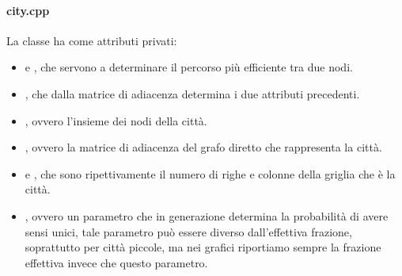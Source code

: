 \documentclass[main.tex]{subfiles}
\begin{document}
        \paragraph{city.cpp}
            La classe  ha come attributi privati:
            \begin{itemize}
                \item {} e , che servono a determinare il percorso più efficiente tra due nodi.
                \item {}, che dalla matrice di adiacenza determina i due attributi precedenti.
                \item {}, ovvero l'insieme dei nodi della città.
                \item {}, ovvero la matrice di adiacenza del grafo diretto che rappresenta la città.
                \item {} e , che sono ripettivamente il numero di righe e colonne della griglia che è la città.
                \item {}, ovvero un parametro che in generazione determina la probabilità di avere sensi unici,
                    tale parametro può essere diverso dall'effettiva frazione, soprattutto per città piccole, ma nei grafici riportiamo sempre la 
                    frazione effettiva invece che questo parametro.
            \end{itemize}
\end{document}
